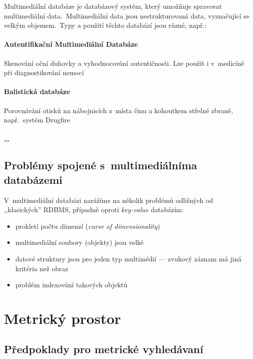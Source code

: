 Multimediální databáze je databázový systém, který umožňuje spravovat
multimediální data\@.~Multimediální data jsou nestrukturovaná data,
vyznačující se velkým objemem\@.~Typy a použití těchto databází
jsou různé, např.:


\paragraph{Autentifikační Multimediální Databáze}

Skenování oční duhovky a vyhodnocování autentičnosti\@. Lze použít
i v~medicíně při diagnostikování nemocí


\paragraph{Balistická databáze }

Porovnávání otisků na nábojnicích z~místa činu a kohoutkem střelné
zbraně, např.~systém Drugfire\cite{drugfire}


\paragraph{\ldots{}}


\subsection{Problémy spojené s~multimediálníma databázemi}

V~multimediální databázi narážíme na několik problémů odlišných od
,,klasických'' RDBMS, případně oproti \emph{key-value }databázím\cite{no-sql}:
\begin{itemize}
\item prokletí počtu dimenzí (\emph{curse of dimensionality})\cite{Bellman195706}
\item multimediální soubory (objekty) jsou velké
\item datové struktury jsou pro jeden typ multimédií --- zvukový záznam
má jiná kritéria než obraz
\item problém indexování takových objektů
\end{itemize}

\section{Metrický prostor}


\subsection{Předpoklady pro metrické vyhledávaní}

